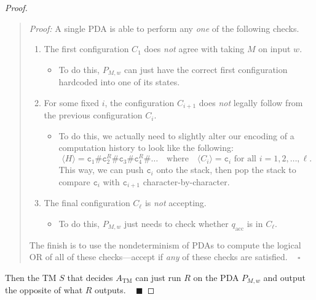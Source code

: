 \begin{proof}
\begin{quote}
        \emph{Proof:}
        A single PDA is able to perform
        any \emph{one} of the following checks.
        \begin{enumerate}
            \item The first configuration $C_1$
            does \emph{not} agree with taking $M$ on input $w$.
            \begin{itemize}
                \item To do this, $P_{M, w}$ can just have
                the correct first configuration hardcoded
                into one of its states.
            \end{itemize}
            \item For some fixed $i$, the configuration $C_{i + 1}$
            does \emph{not} legally follow from
            the previous configuration $C_i$.
            \begin{itemize}
                \item To do this,
                we actually need to slightly alter
                our encoding of a computation history
                to look like the following:
                \[
                \langle H \rangle =
                \texttt{c}_1\texttt{\#}
                \texttt{c}_2^R\texttt{\#}
                \texttt{c}_3\texttt{\#}
                \texttt{c}_4^R\texttt{\#}\dots
                ~~~ \text{ where } ~~~
                \langle C_i \rangle = \texttt{c}_i
                \text{ for all } i = 1, 2, \dots, \ell.
                \]
                This way, we can push $\texttt{c}_i$ onto the stack,
                then pop the stack to compare
                $\texttt{c}_i$ with $\texttt{c}_{i + 1}$
                character-by-character.
            \end{itemize}
            \item The final configuration $C_{\ell}$
            is \emph{not} accepting.
            \begin{itemize}
                \item To do this, $P_{M, w}$
                just needs to check whether $q_{\mathrm{acc}}$
                is in $C_{\ell}$.
            \end{itemize}
        \end{enumerate}
        The finish is to use the nondeterminism of PDAs
        to compute the logical OR of all of these checks---accept
        if \emph{any} of these checks are satisfied.
        ~ $\square$
    \end{quote}
    Then the TM $S$ that decides $A_{\mathrm{TM}}$
    can just run $R$ on the PDA $P_{M, w}$
    and output the opposite of what $R$ outputs.
    ~ $\blacksquare$
\end{proof}

